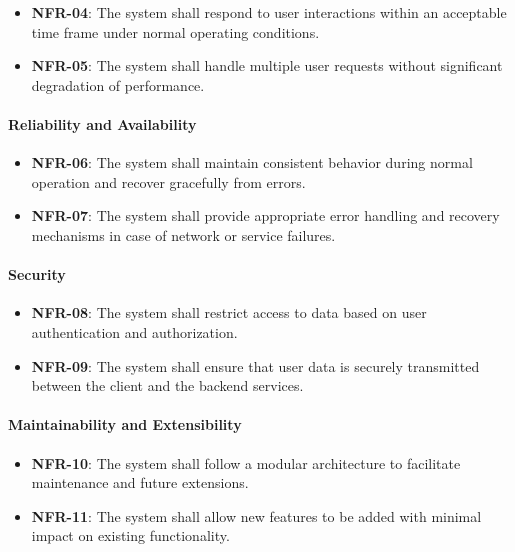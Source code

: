 \documentclass[runningheads,a4paper]{llncs}
\begin{document}
\begin{itemize}
  \item \textbf{NFR-04}: The system shall respond to user interactions within an acceptable time frame under normal operating conditions.
  \item \textbf{NFR-05}: The system shall handle multiple user requests without significant degradation of performance.
\end{itemize}

\paragraph{Reliability and Availability}

\begin{itemize}
  \item \textbf{NFR-06}: The system shall maintain consistent behavior during normal operation and recover gracefully from errors.
  \item \textbf{NFR-07}: The system shall provide appropriate error handling and recovery mechanisms in case of network or service failures.
\end{itemize}

\paragraph{Security}

\begin{itemize}
  \item \textbf{NFR-08}: The system shall restrict access to data based on user authentication and authorization.
  \item \textbf{NFR-09}: The system shall ensure that user data is securely transmitted between the client and the backend services.
\end{itemize}

\paragraph{Maintainability and Extensibility}

\begin{itemize}
  \item \textbf{NFR-10}: The system shall follow a modular architecture to facilitate maintenance and future extensions.
  \item \textbf{NFR-11}: The system shall allow new features to be added with minimal impact on existing functionality.
\end{itemize}
\end{document}
